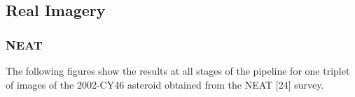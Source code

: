 \subsection{Real Imagery}
\label{ssec:real}

\subsubsection{NEAT}

The following figures show the results at all stages of the pipeline for one triplet of images of the 2002-CY46 asteroid obtained from the NEAT [24] survey.  

